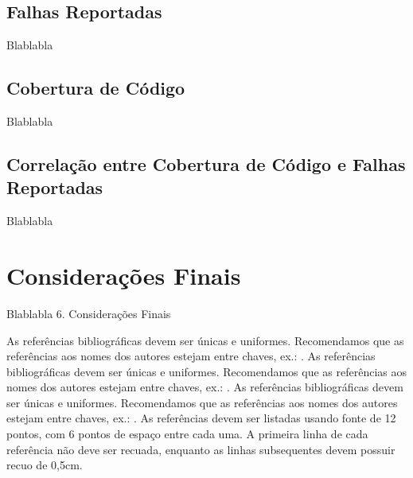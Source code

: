 \documentclass[11.5pt]{article}
\begin{document}
\subsection{Falhas Reportadas}
Blablabla


\subsection{Cobertura de Código}
Blablabla


\subsection{Correlação entre Cobertura de Código e Falhas Reportadas}
Blablabla




\section{Considerações Finais}
Blablabla
6. Considerações Finais




As referências bibliográficas devem ser únicas e uniformes. Recomendamos que as referências aos nomes dos autores estejam entre chaves, ex.: \cite{knuth:84}.
As referências bibliográficas devem ser únicas e uniformes. Recomendamos que as referências aos nomes dos autores estejam entre chaves, ex.: \cite{boulic:91}.
As referências bibliográficas devem ser únicas e uniformes. Recomendamos que as referências aos nomes dos autores estejam entre chaves, ex.: \cite{smith:99}.
As referências devem ser listadas usando fonte de 12 pontos, com 6 pontos de espaço entre cada uma. A primeira linha de cada referência não deve ser recuada, enquanto as linhas subsequentes devem possuir recuo de 0,5cm.



\end{document}
